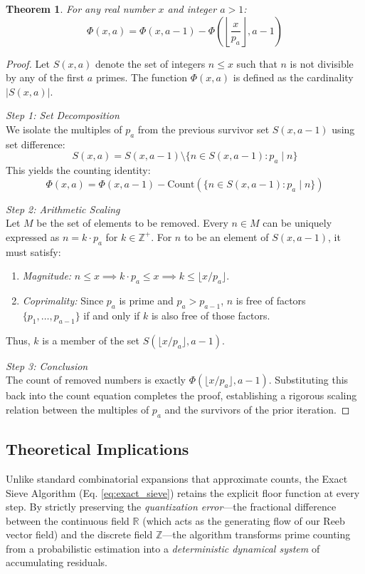 \documentclass[sn-mathphys-num, pdflatex, referee]{sn-jnl}
\newtheorem{theorem}{Theorem}[section]
\begin{document}
\begin{theorem} For any real number $x$ and integer $a > 1$:
\[ \Phi(x, a) = \Phi(x, a-1) - \Phi\left( \left\lfloor \frac{x}{p_a} \right\rfloor, a-1 \right) \]
\end{theorem}
\begin{proof}
Let $S(x, a)$ denote the set of integers $n \le x$ such that $n$ is not divisible by any of the first $a$ primes. The function $\Phi(x, a)$ is defined as the cardinality $|S(x, a)|$.

\textit{Step 1: Set Decomposition}\\
We isolate the multiples of $p_a$ from the previous survivor set $S(x, a-1)$ using set difference:
\[ S(x, a) = S(x, a-1) \setminus \{ n \in S(x, a-1) : p_a \mid n \} \]
This yields the counting identity:
\[ \Phi(x, a) = \Phi(x, a-1) - \text{Count} \left( \{ n \in S(x, a-1) : p_a \mid n \} \right) \]

\textit{Step 2: Arithmetic Scaling}\\
Let $M$ be the set of elements to be removed. Every $n \in M$ can be uniquely expressed as $n = k \cdot p_a$ for $k \in \mathbb{Z}^+$. For $n$ to be an element of $S(x, a-1)$, it must satisfy:
\begin{enumerate}
    \item \textit{Magnitude:} $n \le x \implies k \cdot p_a \le x \implies k \le \lfloor x/p_a \rfloor$.
    \item \textit{Coprimality:} Since $p_a$ is prime and $p_a > p_{a-1}$, $n$ is free of factors $\{p_1, \dots, p_{a-1}\}$ if and only if $k$ is also free of those factors. 
\end{enumerate}
Thus, $k$ is a member of the set $S(\lfloor x/p_a \rfloor, a-1)$.

\textit{Step 3: Conclusion}\\
The count of removed numbers is exactly $\Phi(\lfloor x/p_a \rfloor, a-1)$. Substituting this back into the count equation completes the proof, establishing a rigorous scaling relation between the multiples of $p_a$ and the survivors of the prior iteration.
\end{proof}

\subsection{Theoretical Implications}
Unlike standard combinatorial expansions that approximate counts, the Exact Sieve Algorithm (Eq. \ref{eq:exact_sieve}) retains the explicit floor function at every step. By strictly preserving the \textit{quantization error}---the fractional difference between the continuous field $\mathbb{R}$ (which acts as the generating flow of our Reeb vector field) and the discrete field $\mathbb{Z}$---the algorithm transforms prime counting from a probabilistic estimation into a \textit{deterministic dynamical system} of accumulating residuals.
\end{document}
